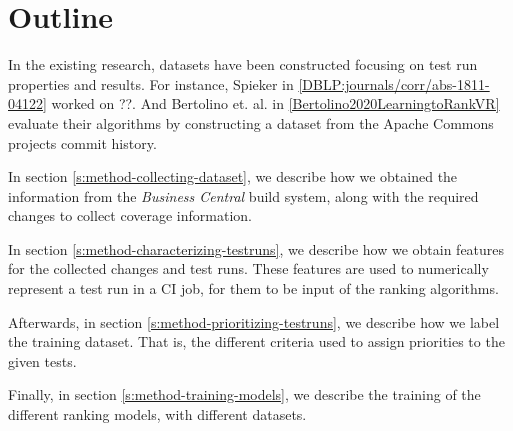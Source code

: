 \section{Outline}

In the existing research, datasets have been constructed focusing on test run properties 
and results. For instance, Spieker in \ref{DBLP:journals/corr/abs-1811-04122} worked on ??. 
And Bertolino et. al. in \ref{Bertolino2020LearningtoRankVR} evaluate their algorithms 
by constructing a dataset from the Apache Commons projects commit history.

In section \ref{s:method-collecting-dataset}, we describe how we obtained the information
from the \emph{Business Central} build system, along with the required changes to collect 
coverage information.

In section \ref{s:method-characterizing-testruns}, we describe how we obtain features for
the collected changes and test runs. These features are used to numerically represent a 
test run in a CI job, for them to be input of the ranking algorithms.

Afterwards, in section \ref{s:method-prioritizing-testruns}, we describe how we label
the training dataset. That is, the different criteria used to assign priorities to
the given tests.

Finally, in section \ref{s:method-training-models}, we describe the training of the 
different ranking models, with different datasets.